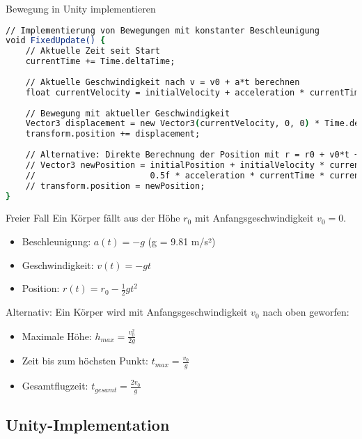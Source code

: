 \begin{examplecode}{Bewegung in Unity implementieren}
    \begin{lstlisting}[language=csh, style=basesmol]
// Implementierung von Bewegungen mit konstanter Beschleunigung
void FixedUpdate() {
    // Aktuelle Zeit seit Start
    currentTime += Time.deltaTime;
    
    // Aktuelle Geschwindigkeit nach v = v0 + a*t berechnen
    float currentVelocity = initialVelocity + acceleration * currentTime;
    
    // Bewegung mit aktueller Geschwindigkeit
    Vector3 displacement = new Vector3(currentVelocity, 0, 0) * Time.deltaTime;
    transform.position += displacement;
    
    // Alternative: Direkte Berechnung der Position mit r = r0 + v0*t + 0.5*a*t^2
    // Vector3 newPosition = initialPosition + initialVelocity * currentTime + 
    //                       0.5f * acceleration * currentTime * currentTime;
    // transform.position = newPosition;
}
    \end{lstlisting}
\end{examplecode}

\begin{example2}{Freier Fall}
    Ein Körper fällt aus der Höhe $r_0$ mit Anfangsgeschwindigkeit $v_0 = 0$.
    
    \begin{itemize}
        \item Beschleunigung: $a(t) = -g$ (g = 9.81 m/s²)
        \item Geschwindigkeit: $v(t) = -gt$
        \item Position: $r(t) = r_0 - \frac{1}{2}gt^2$
    \end{itemize}
    
    Alternativ: Ein Körper wird mit Anfangsgeschwindigkeit $v_0$ nach oben geworfen:
    \begin{itemize}
        \item Maximale Höhe: $h_{max} = \frac{v_0^2}{2g}$ 
        \item Zeit bis zum höchsten Punkt: $t_{max} = \frac{v_0}{g}$
        \item Gesamtflugzeit: $t_{gesamt} = \frac{2v_0}{g}$
    \end{itemize}
\end{example2}

\subsection{Unity-Implementation}

